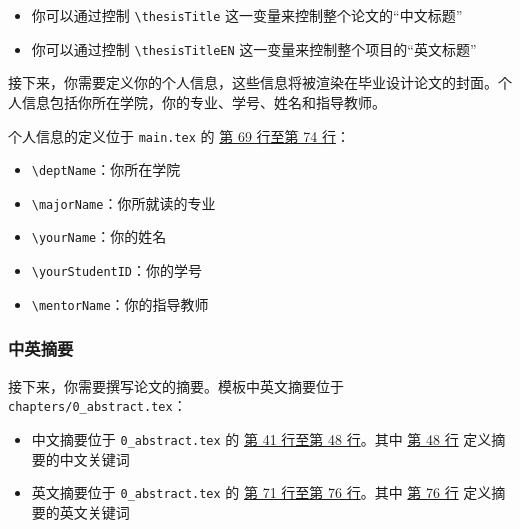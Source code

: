 \begin{itemize}
  \item 你可以通过控制 \texttt{\textbackslash thesisTitle} 这一变量来控制整个论文的“中文标题”
  \item 你可以通过控制 \texttt{\textbackslash thesisTitleEN} 这一变量来控制整个项目的“英文标题”
\end{itemize}

接下来，你需要定义你的个人信息，这些信息将被渲染在毕业设计论文的封面。个人信息包括你所在学院，你的专业、学号、姓名和指导教师。

个人信息的定义位于 \texttt{main.tex} 的 \href{https://github.com/spencerwooo/BIThesis/blob/master/graduation-thesis/main.tex#L69-L74}{第 69 行至第 74 行}：

\begin{itemize}
  \item \texttt{\textbackslash deptName}：你所在学院
  \item \texttt{\textbackslash majorName}：你所就读的专业
  \item \texttt{\textbackslash yourName}：你的姓名
  \item \texttt{\textbackslash yourStudentID}：你的学号
  \item \texttt{\textbackslash mentorName}：你的指导教师
\end{itemize}

\subsubsection{中英摘要}

接下来，你需要撰写论文的摘要。模板中英文摘要位于\\ \texttt{chapters/0\_abstract.tex}：

\begin{itemize}
  \item 中文摘要位于 \texttt{0\_abstract.tex} 的 \href{https://github.com/spencerwooo/BIThesis/blob/master/graduation-thesis/chapters/0_abstract.tex#L41-L48}{第 41 行至第 48 行}。其中 \href{https://github.com/spencerwooo/BIThesis/blob/master/graduation-thesis/chapters/0_abstract.tex#L48}{第 48 行} 定义摘要的中文关键词
  \item 英文摘要位于 \texttt{0\_abstract.tex} 的 \href{https://github.com/spencerwooo/BIThesis/blob/master/graduation-thesis/chapters/0_abstract.tex#L71-L76}{第 71 行至第 76 行}。其中 \href{https://github.com/spencerwooo/BIThesis/blob/master/graduation-thesis/chapters/0_abstract.tex#L76}{第 76 行} 定义摘要的英文关键词
\end{itemize}

